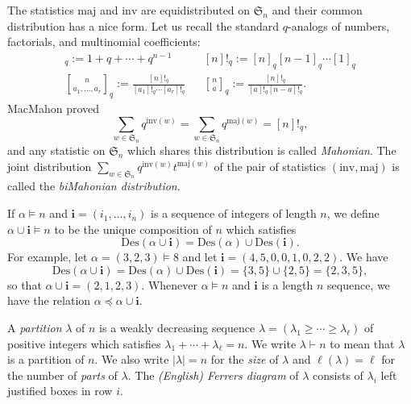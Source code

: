 \documentclass[10pt]{amsart}
\theoremstyle{definition}
\newcommand{\maj}{{\mathrm {maj}}}
\newcommand{\inv}{{\mathrm {inv}}}
\newcommand{\Des}{{\mathrm {Des}}}
\newcommand{\symm}{{\mathfrak{S}}}
\newcommand{\ii}{{\mathbf{i}}}
\begin{document}
The statistics $\maj$ and $\inv$ are equidistributed on $\symm_n$ and their common distribution has
a nice form.    Let us recall the standard $q$-analogs of numbers, factorials, and multinomial coefficients:
\begin{align*}
[n]_q := 1 + q + \cdots + q^{n-1} &   &[n]!_q := [n]_q [n-1]_q \cdots [1]_q  \\
{n \brack a_1, \dots , a_r}_q := \frac{[n]!_q}{[a_1]!_q \cdots [a_r]!_q} 
& &{n \brack a}_q := \frac{[n]!_q}{[a]!_q [n-a]!_q}.
\end{align*}
MacMahon \cite{MacMahon} proved  
\begin{equation}
\sum_{w \in \symm_n} q^{\inv(w)} = \sum_{w \in \symm_n} q^{\maj(w)} = [n]!_q,
\end{equation}
and any statistic on $\symm_n$ which shares this distribution is called \emph{Mahonian}.
The joint distribution $\sum_{w \in \symm_n} q^{\inv(w)} t^{\maj(w)}$ of the pair of statistics
$(\inv, \maj)$ is called the \emph{biMahonian distribution}.




If $\alpha \models n$ and $\ii = (i_1, \dots, i_n)$ 
is a sequence of  integers of length $n$, we define $\alpha \cup \ii \models n$ 
to be the unique composition of $n$ which satisfies
\begin{equation}
\Des(\alpha \cup \ii) = \Des(\alpha) \cup \Des(\ii).
\end{equation}
For example, let $\alpha = (3,2,3) \models 8$ and let
$\ii = (4,5,0,0,1,0,2,2)$.  We have 
\begin{equation*}
\Des(\alpha \cup \ii) = \Des(\alpha) \cup \Des(\ii) = \{3,5\} \cup \{2,5\} = \{2,3,5\},
\end{equation*}
so that $\alpha \cup \ii = (2,1,2,3)$.
Whenever $\alpha \models n$ and $\ii$ is a length $n$ sequence, we have the 
relation $\alpha \preceq \alpha \cup \ii$.

A \emph{partition} $\lambda$ of $n$ is a weakly decreasing sequence $\lambda = (\lambda_1 \geq \cdots \geq \lambda_{\ell})$
of positive integers
which satisfies $\lambda_1 + \cdots + \lambda_{\ell} = n$.  We write
$\lambda \vdash n$ to mean that $\lambda$ is a partition of $n$.  We also write
$|\lambda| = n$ for the \emph{size} of $\lambda$ and $\ell(\lambda) = \ell$ for the number of \emph{parts}
of $\lambda$.
The \emph{(English) Ferrers diagram}
of $\lambda$ consists of $\lambda_i$ left justified boxes in row $i$.
\end{document}
